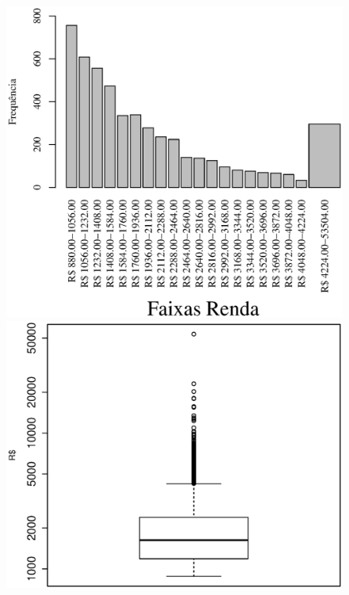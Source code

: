 \documentclass[10pt,a4paper,oneside]{article}
\begin{document}
\begin{figure}[h]
\begin{minipage}{0.46\textwidth}
		\includegraphics[width=\linewidth]{plots/histogram_renda.eps}

		\includegraphics[width=\linewidth]{plots/boxplot_renda_log.eps}

	\label{figure:histograma-boxplot-renda}
\end{minipage}
\end{figure}
\end{document}
